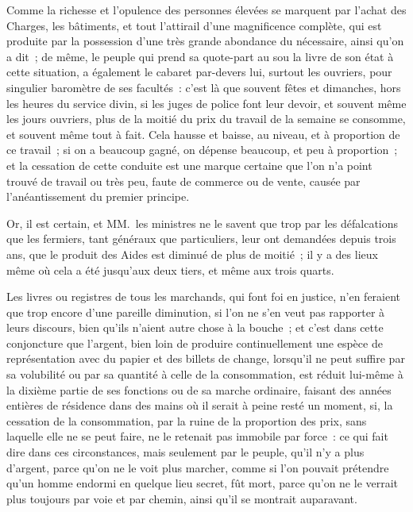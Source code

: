 \documentclass[french,twoside]{book} %
\begin{document}
Comme la richesse et l’opulence des personnes élevées se marquent par l’achat des Charges, les bâtiments, et tout l’attirail d’une magnificence complète, qui est produite par la possession d’une très grande abondance du nécessaire, ainsi qu’on a dit ; de même, le peuple qui prend sa quote-part au sou la livre de son état à cette situation, a également le cabaret par-devers lui, surtout les ouvriers, pour singulier baromètre de ses facultés : c’est là que souvent fêtes et dimanches, hors les heures du service divin, si les juges de police font leur devoir, et souvent même les jours ouvriers, plus de la moitié du prix du travail de la semaine se consomme, et souvent même tout à fait. Cela hausse et baisse, au niveau, et à proportion de ce travail ; si on a beaucoup gagné, on dépense beaucoup, et peu à proportion ; et la cessation de cette conduite est une marque certaine que l’on n’a point trouvé de travail ou très peu, faute de commerce ou de vente, causée par l’anéantissement du premier principe.\par
Or, il est certain, et MM. les ministres ne le savent que trop par les défalcations que les fermiers, tant généraux que particuliers, leur ont demandées depuis trois ans, que le produit des Aides est diminué de plus de moitié ; il y a des lieux même où cela a été jusqu’aux deux tiers, et même aux trois quarts.\par
Les livres ou registres de tous les marchands, qui font foi en justice, n’en feraient que trop encore d’une pareille diminution, si l’on ne s’en veut pas rapporter à leurs discours, bien qu’ils n’aient autre chose à la bouche ; et c’est dans cette conjoncture que l’argent, bien loin de produire continuellement une espèce de représentation avec du papier et des billets de change, lorsqu’il ne peut suffire par sa volubilité ou par sa quantité à celle de la consommation, est réduit lui-même à la dixième partie de ses fonctions ou de sa marche ordinaire, faisant des années entières de résidence dans des mains où il serait à peine resté un moment, si, la cessation de la consommation, par la ruine de la proportion des prix, sans laquelle elle ne se peut faire, ne le retenait pas immobile par force : ce qui fait dire dans ces circonstances, mais seulement par le peuple, qu’il n’y a plus d’argent, parce qu’on ne le voit plus marcher, comme si l’on pouvait prétendre qu’un homme endormi en quelque lieu secret, fût mort, parce qu’on ne le verrait plus toujours par voie et par chemin, ainsi qu’il se montrait auparavant.
\end{document}
